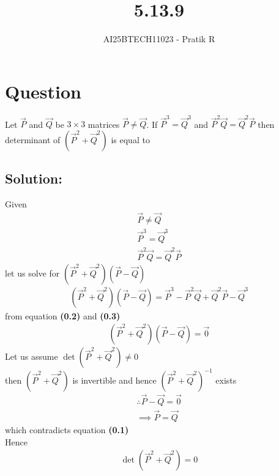 \documentclass[journal]{IEEEtran}
\begin{document}

\vspace{3cm}

\title{5.13.9}
\author{AI25BTECH11023 - Pratik R}
{\let\newpage\relax\maketitle}

\renewcommand{\thefigure}{\theenumi}
\renewcommand{\thetable}{\theenumi}
\setlength{\intextsep}{10pt} %


\renewcommand{\thetable}{\theenumi}


\section*{\textbf{Question}}
Let $\vec{P}$ and $\vec{Q}$ be $3\times 3$ matrices $\vec{P}\neq \vec{Q}$. If $\vec{P}^3 = \vec{Q}^3$ and $\vec{P}^2\vec{Q}=\vec{Q}^2\vec{P}$ then determinant of $(\vec{P}^2+\vec{Q}^2)$ is equal to 

\subsection*{\textbf{Solution:}} 
Given
\begin{align}
  \vec{P}\neq \vec{Q} \\
  \vec{P}^3 = \vec{Q}^3 \\
  \vec{P}^2\vec{Q}=\vec{Q}^2\vec{P}
\end{align}
let us solve for $(\vec{P}^2+\vec{Q}^2)(\vec{P}-\vec{Q})$
\begin{align}
   (\vec{P}^2+\vec{Q}^2)(\vec{P}-\vec{Q}) = \vec{P}^3 - \vec{P}^2\vec{Q} + \vec{Q}^2\vec{P} - \vec{Q}^3
\end{align}
from equation \textbf{(0.2)} and \textbf{(0.3)}
\begin{align}
 (\vec{P}^2+\vec{Q}^2)(\vec{P}-\vec{Q}) =\vec{0}
\end{align}
Let us assume $\det(\vec{P}^2+\vec{Q}^2) \neq 0$ \\
then $(\vec{P}^2+\vec{Q}^2)$ is invertible and hence 
$(\vec{P}^2+\vec{Q}^2)^{-1}$ exists
\begin{align}
   \therefore \vec{P}-\vec{Q} =\vec{0} \\
   \implies \vec{P}=\vec{Q}
\end{align}
which contradicts equation \textbf{(0.1)}\\
Hence 
\begin{align}
    \det(\vec{P}^2+\vec{Q}^2)= 0
\end{align}
\end{document}
